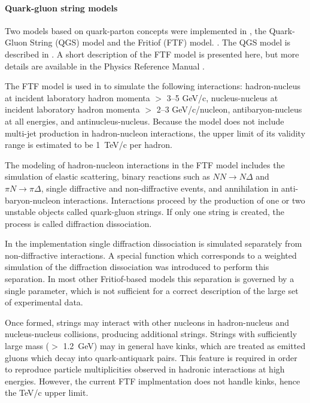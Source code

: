 \paragraph{Quark-gluon string models}
Two models based on quark-parton concepts were implemented in \Gfour{}, the
Quark-Gluon String (QGS) model
\cite{hadbib:FTF1,hadbib:FTF2} and the Fritiof (FTF) model.
\cite{hadbib:FTF3,hadbib:FTF4}.
The QGS model is described in \cite{bib:G4}.  A short description of the FTF
model is presented here, but more details are available in the \Gfour{} 
Physics Reference Manual \cite{hadbib:FTF19}.


The FTF model is used in \Gfour{} to simulate the following interactions:
hadron-nucleus at incident laboratory hadron momenta $>$ 3--5 GeV/c, 
nucleus-nucleus at incident laboratory hadron momenta $>$ 2--3 GeV/c/nucleon,
antibaryon-nucleus at all energies, and antinucleus-nucleus.
Because the model does not include multi-jet production in hadron-nucleon 
interactions, the upper limit of its validity range is estimated to be 1~TeV/c 
per hadron.

The modeling of hadron-nucleon interactions in the FTF model includes the
simulation of elastic scattering, binary reactions such as 
$NN\rightarrow N\Delta$ and $\pi N\rightarrow \pi \Delta$, single diffractive 
and non-diffractive events, and annihilation in anti-baryon-nucleon interactions.
Interactions proceed by the production of one or two unstable objects called 
quark-gluon strings.  If only one string is created, the process is called 
diffraction dissociation.  

In the \Gfour{} implementation single diffraction dissociation is simulated 
separately from non-diffractive interactions.  A special function which 
corresponds to a weighted simulation of the diffraction dissociation was
introduced to perform this separation.  In most other Fritiof-based models 
this separation is governed by a single parameter, which is not sufficient for
a correct description of the large set of experimental data. 

Once formed, strings may interact with other nucleons in hadron-nucleus and 
nucleus-nucleus collisions, producing additional strings.  Strings with 
sufficiently large mass ($>$ 1.2~GeV) may in general have kinks, which are
treated as emitted gluons which decay into quark-antiquark pairs.  This feature
is required in order to reproduce particle multiplicities observed in hadronic 
interactions at high energies.  However, the current FTF implmentation does not 
handle kinks, hence the TeV/c upper limit.  

